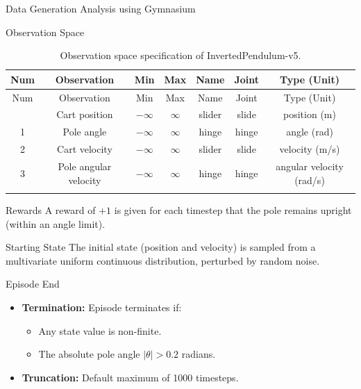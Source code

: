 \begin{frame}[fragile]{Data Generation Analysis using Gymnasium}
\begin{block}{Observation Space}
\begin{longtable}[]{@{}ccccccc@{}}
\caption{Observation space specification of
InvertedPendulum-v5.}\tabularnewline
\toprule\noalign{}
Num & Observation & Min & Max & Name & Joint & Type (Unit) \\
\midrule\noalign{}
\endfirsthead
\toprule\noalign{}
Num & Observation & Min & Max & Name & Joint & Type (Unit) \\
\midrule\noalign{}
\endhead
0 & Cart position & \(-\infty\) & \(\infty\) & slider & slide & position
(m) \\
1 & Pole angle & \(-\infty\) & \(\infty\) & hinge & hinge & angle
(rad) \\
2 & Cart velocity & \(-\infty\) & \(\infty\) & slider & slide & velocity
(m/s) \\
3 & Pole angular velocity & \(-\infty\) & \(\infty\) & hinge & hinge &
angular velocity (rad/s) \\
\bottomrule\noalign{}
\end{longtable}
\end{block}

\begin{block}{Rewards}
\protect{}\label{rewards}
A reward of \(+1\) is given for each timestep that the pole remains
upright (within an angle limit).
\end{block}

\begin{block}{Starting State}
\protect{}\label{starting-state}
The initial state (position and velocity) is sampled from a multivariate
uniform continuous distribution, perturbed by random noise.
\end{block}

\begin{block}{Episode End}
\protect{}\label{episode-end}
\begin{itemize}
\item
  \textbf{Termination:} Episode terminates if:

  \begin{itemize}
  \item
    Any state value is non-finite.
  \item
    The absolute pole angle \(|\theta| > 0.2\) radians.
  \end{itemize}
\item
  \textbf{Truncation:} Default maximum of 1000 timesteps.
\end{itemize}
\end{block}


\end{frame}

